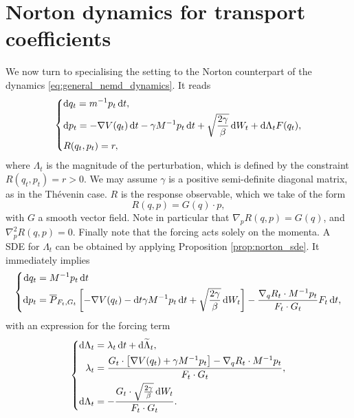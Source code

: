 \section{Norton dynamics for transport coefficients}
We now turn to specialising the setting to the Norton counterpart of the dynamics \eqref{eq:general_nemd_dynamics}. It reads
\begin{equation}
    \label{eq:norton_dynamics_general}
    \left\{ 
        \begin{aligned}
            &\mathrm{d} q_t=m^{-1}p_t\,\mathrm{d} t,\\
            &\mathrm{d} p_t=-\nabla V(q_t)\,\mathrm{d} t-\gamma M^{-1}p_t\,\mathrm{d} t +\sqrt{\frac{2\gamma}\beta}\,\mathrm{d} W_t +\mathrm{d} \Lambda_t F(q_t),\\
            &R(q_t,p_t)=r,
        \end{aligned}
    \right.
\end{equation}
where $\Lambda_t$ is the magnitude of the perturbation, which is defined by the constraint $R(q_t,p_t)=r>0$.
We may assume $\gamma$ is a positive semi-definite diagonal matrix, as in the Thévenin case. $R$ is the response observable, which we take of the form
\[R(q,p)=G(q)\cdot p,\]
with $G$ a smooth vector field. Note in particular that $\nabla_p R(q,p)=G(q)$, and $\nabla_p^2 R(q,p)=0$. Finally note that the forcing acts solely on the momenta.
A SDE for $\Lambda_t$ can be obtained by applying Proposition \ref{prop:norton_sde}.
It immediately implies 
\begin{equation}
    \label{eq:norton_dynamics_general_solved}
    \left\{
        \begin{aligned}
            \mathrm{d} q_t &= M^{-1}p_t \,\mathrm{d} t\\
            \mathrm{d} p_t &= \overline{P}_{F_t,G_t}\left[-\nabla V(q_t)-\mathrm{d} t\gamma M^{-1}p_t\,\mathrm{d} t + \sqrt{\frac{2\gamma}{\beta}}\,\mathrm{d} W_t\right] - \frac{\nabla_q R_t\cdot M^{-1}p_t}{F_t\cdot G_t}F_t\,\mathrm{d} t,
        \end{aligned}\right.
\end{equation}
with an expression for the forcing term
\begin{equation}
    \label{eq:norton_forcing_term}
    \left\{\begin{aligned}
        \mathrm{d} \Lambda_t &= \lambda_t \,\mathrm{d} t + \mathrm{d}\widetilde{\Lambda}_t,\\
        \lambda_t &= \frac{G_t\cdot\left[\nabla V(q_t) + \gamma M^{-1}p_t \right] - \nabla_q R_t\cdot M^{-1}p_t}{F_t\cdot G_t},\\
        \mathrm{d} \Lambda_t &= -\frac{G_t\cdot\sqrt{\frac{2\gamma}\beta}\,\mathrm{d} W_t}{F_t\cdot G_t}.
    \end{aligned}\right.
\end{equation}

